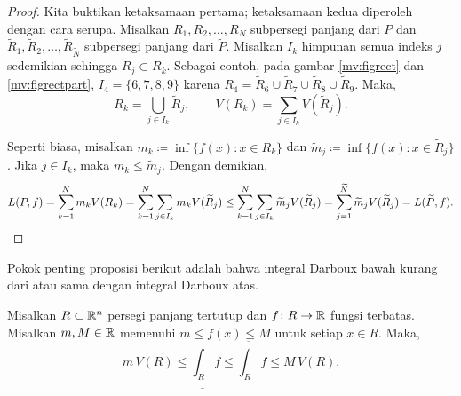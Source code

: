 \begin{proof}
Kita buktikan ketaksamaan pertama; ketaksamaan kedua diperoleh dengan cara
serupa. Misalkan $R_1,R_2,\ldots,R_N$ subpersegi panjang dari $P$ dan
$\widetilde{R}_1,\widetilde{R}_2,\ldots,\widetilde{R}_{\widetilde{N}}$
subpersegi panjang dari $\widetilde{P}$. Misalkan $I_k$ himpunan semua indeks
$j$ sedemikian sehingga $\widetilde{R}_j \subset R_k$. Sebagai contoh, pada
gambar \ref{mv:figrect} dan \ref{mv:figrectpart},
$I_4 = \{ 6, 7, 8, 9 \}$ karena
$R_4 =
\widetilde{R}_6 \cup \widetilde{R}_7 \cup
\widetilde{R}_8 \cup \widetilde{R}_9$.
Maka,
\begin{equation*}
R_k = \bigcup_{j \in I_k} \widetilde{R}_j,
\qquad
V(R_k) = \sum_{j \in I_k} V(\widetilde{R}_j).
\end{equation*}

Seperti biasa, misalkan
$m_k \coloneqq \inf \bigl\{ f(x) : x \in R_k \bigr\}$ dan
$\widetilde{m}_j \coloneqq \inf \bigl\{ f(x) : x \in \widetilde{R}_j \bigr\}$.
Jika $j \in I_k$, maka $m_k \leq \widetilde{m}_j$. Dengan demikian,
\begin{equation*}
L(P,f)
=
\sum_{k=1}^N m_k V(R_k)
=
\sum_{k=1}^N \sum_{j\in I_k} m_k V(\widetilde{R}_j)
\leq
\sum_{k=1}^N \sum_{j\in I_k} \widetilde{m}_j V(\widetilde{R}_j)
=
\sum_{j=1}^{\widetilde{N}} \widetilde{m}_j V(\widetilde{R}_j) = L(\widetilde{P},f) .
\qedhere
\end{equation*}
\end{proof}

Pokok penting proposisi berikut adalah bahwa integral Darboux bawah kurang dari
atau sama dengan integral Darboux atas.

\begin{prop} \label{mv:intulbound:prop}
Misalkan $R \subset {\mathbb{R}}^n$ persegi panjang tertutup dan
$f \colon R \to {\mathbb{R}}$ fungsi terbatas. Misalkan $m, M \in {\mathbb{R}}$ memenuhi
$m \leq f(x) \leq M$ untuk setiap $x \in R$. Maka,
\begin{equation}
\label{mv:intulbound:eq}
m \, V(R) \leq
\underline{\int_R} f \leq \overline{\int_R} f
\leq M \, V(R).
\end{equation}
\end{prop}

